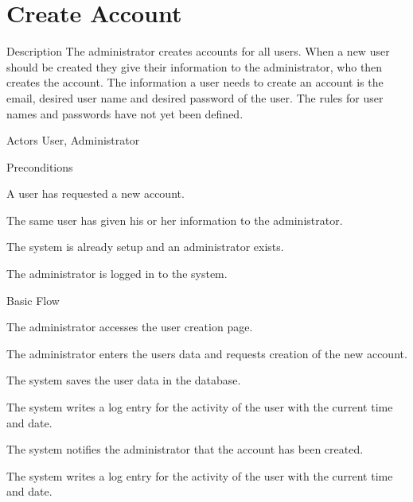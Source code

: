 \section{Create Account}


%
\begin{cpart}{Description}
The administrator creates accounts for all users. When a new user should be created they give their information to the administrator, who then creates the account. The information a user needs to create an account is the email, desired user name and desired password of the user. The rules for user names and passwords have not yet been defined.
\end{cpart}


%
\begin{cpart}{Actors}
User, Administrator
\end{cpart}

%
\begin{cpartList}{Preconditions}
\item A user has requested a new account.
\item The same user has given his or her information to the administrator.
\item The system is already setup and an administrator exists.
\item The administrator is logged in to the system.
\end{cpartList}

%
\begin{cpartList}{Basic Flow}
  \item The administrator accesses the user creation page.
  \item The administrator enters the users data and requests creation of the new account.
  \item The system saves the user data in the database.
\item The system writes a log entry for the activity of the user with the current time and date.
  \item The system notifies the administrator that the account has been created.
  \item The system writes a log entry for the activity of the user with the current time and date.
\end{cpartList}

